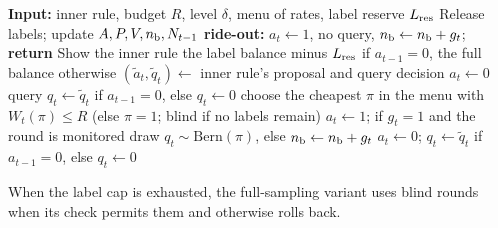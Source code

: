\documentclass[10pt]{article}
\theoremstyle{plain}
\theoremstyle{definition}
\begin{document}
\begin{table}[!htbp]
\caption{Running example ($k=\ExK$, $R=\ExR$, $d=\ExD$, full sampling, every round exposed, promotion at round 1): the check $W$ at the $n$-th exposed round on a tape where every round is harmful and on one where every round benefits the challenger.}\label{tab:example}
\centering\small

\end{table}



\begin{algorithm}[t]
\caption{One round of the risk-budget shield; paced settlement uses the accounting construction in Appendix~\ref{app:v2}.}\label{alg:shield}
\begin{algorithmic}
\STATE \textbf{Input:} inner rule, budget $R$, level $\delta$, menu of rates, label reserve $L_{\rm res}$
\STATE Release labels; update $A,P,V,n_{\rm b},N_{t-1}$
  \STATE \textbf{ride-out:} $a_t\leftarrow1$, no query, $n_{\rm b}\leftarrow n_{\rm b}+g_t$; \textbf{return} 
\ENDIF
\STATE Show the inner rule the label balance minus $L_{\rm res}$ if $a_{t-1}=0$, the full balance otherwise
\STATE $(\tilde a_t,\tilde q_t)\leftarrow$ inner rule's proposal and query decision
  \STATE $a_t\leftarrow0$ 
  \STATE query $q_t\leftarrow\tilde q_t$ if $a_{t-1}=0$, else $q_t\leftarrow0$ 
\ELSE
  \STATE choose the cheapest $\pi$ in the menu with $W_t(\pi)\le R$ (else $\pi=1$; blind if no labels remain)
   \STATE $a_t\leftarrow1$; if $g_t=1$ and the round is monitored draw $q_t\sim\mathrm{Bern}(\pi)$, else $n_{\rm b}\leftarrow n_{\rm b}+g_t$ 
  \ELSE \STATE $a_t\leftarrow0$; $q_t\leftarrow\tilde q_t$ if $a_{t-1}=0$, else $q_t\leftarrow0$ 
  \ENDIF
\ENDIF
\end{algorithmic}
\end{algorithm}

When the label cap is exhausted, the full-sampling variant uses blind rounds when its check permits them and otherwise rolls back.

\FloatBarrier
\end{document}

